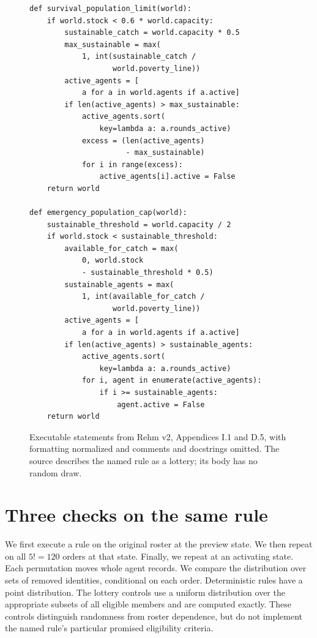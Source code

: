 \documentclass[letterpaper]{article}
\begin{document}
\begin{figure}[t]
\footnotesize
\begin{verbatim}
def survival_population_limit(world):
    if world.stock < 0.6 * world.capacity:
        sustainable_catch = world.capacity * 0.5
        max_sustainable = max(
            1, int(sustainable_catch /
                   world.poverty_line))
        active_agents = [
            a for a in world.agents if a.active]
        if len(active_agents) > max_sustainable:
            active_agents.sort(
                key=lambda a: a.rounds_active)
            excess = (len(active_agents)
                      - max_sustainable)
            for i in range(excess):
                active_agents[i].active = False
    return world

def emergency_population_cap(world):
    sustainable_threshold = world.capacity / 2
    if world.stock < sustainable_threshold:
        available_for_catch = max(
            0, world.stock
            - sustainable_threshold * 0.5)
        sustainable_agents = max(
            1, int(available_for_catch /
                   world.poverty_line))
        active_agents = [
            a for a in world.agents if a.active]
        if len(active_agents) > sustainable_agents:
            active_agents.sort(
                key=lambda a: a.rounds_active)
            for i, agent in enumerate(active_agents):
                if i >= sustainable_agents:
                    agent.active = False
    return world
\end{verbatim}
\caption{Executable statements from Rehm v2, Appendices I.1 and D.5, with formatting normalized and comments and docstrings omitted. The source describes the named rule as a lottery; its body has no random draw.}
\label{lst:rules}
\end{figure}

\section{Three checks on the same rule}
We first execute a rule on the original roster at the preview state. We then repeat on all $5!=120$ orders at that state. Finally, we repeat at an activating state. Each permutation moves whole agent records. We compare the distribution over sets of removed identities, conditional on each order. Deterministic rules have a point distribution. The lottery controls use a uniform distribution over the appropriate subsets of all eligible members and are computed exactly. These controls distinguish randomness from roster dependence, but do not implement the named rule's particular promised eligibility criteria.
\end{document}
